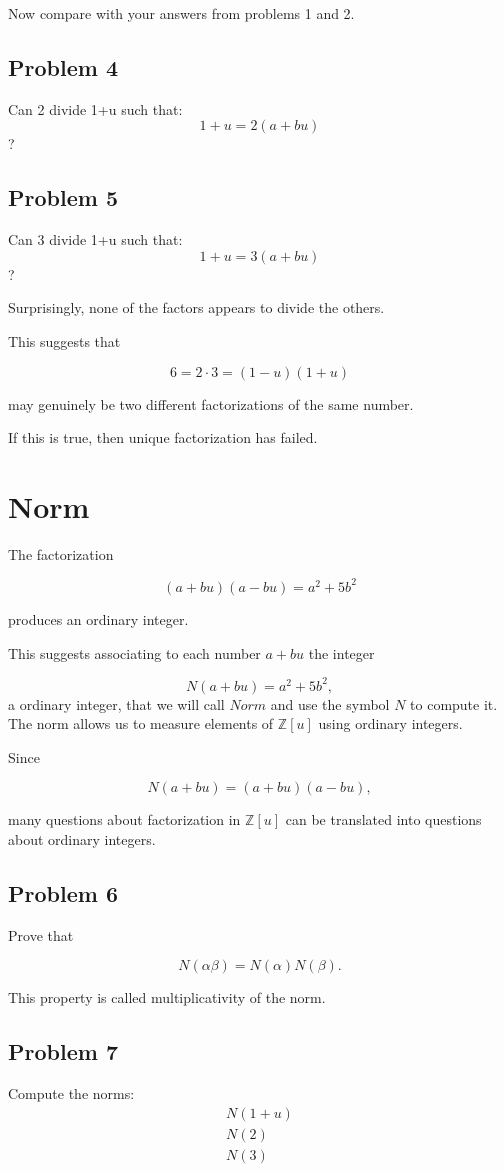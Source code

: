 Now compare with your answers from problems 1 and 2.

\subsection{Problem 4}
Can 2 divide 1+u such that:
 \[1+u = 2(a+bu)\]?

 \subsection{Problem 5}
Can 3 divide 1+u such that:
 \[1+u = 3(a+bu)\]?

Surprisingly, none of the factors appears to divide the others.

This suggests that

\[
6 = 2\cdot3=(1-u)(1+u)
\]

may genuinely be two different factorizations of the same number.

If this is true, then unique factorization has failed.

\section{Norm}

The factorization

\[
(a+bu)(a-bu)
=
a^2+5b^2
\]

produces an ordinary integer.

This suggests associating to each number \(a+bu\) the integer

\[
N(a+bu)=a^2+5b^2,
\]
a ordinary integer, that we will call $\textit{Norm}$ and use the symbol $\textit{N}$ to compute it.
The norm allows us to measure elements of \(\mathbb Z[u]\) using ordinary integers.

Since

\[
N(a+bu)
=
(a+bu)(a-bu),
\]

many questions about factorization in \(\mathbb Z[u]\) can be translated into questions about ordinary integers.
\subsection{Problem 6}

Prove that

\[
N(\alpha\beta)
=
N(\alpha)N(\beta).
\]

This property is called multiplicativity of the norm.

\subsection{Problem 7}
Compute the norms:
\begin{align*}
N(1+u) \\
N(2) \\
N(3)
\end{align*}

